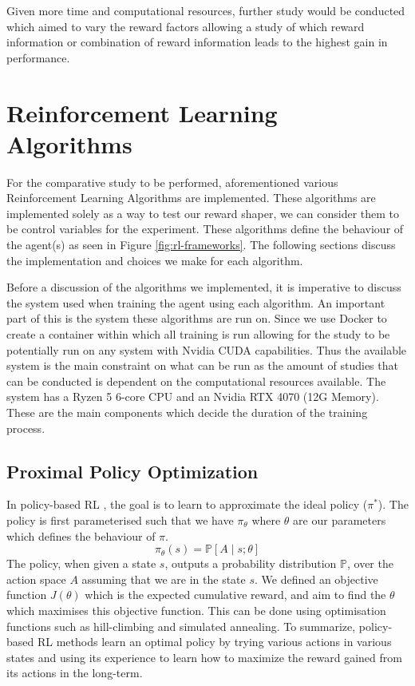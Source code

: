 \documentclass[11pt]{article}
\begin{document}
Given more time and computational resources, further study would be conducted which aimed to vary the reward factors allowing a study of which reward information or combination of reward information leads to the highest gain in performance.

\section{Reinforcement Learning Algorithms}

For the comparative study to be performed, aforementioned various Reinforcement Learning Algorithms are implemented. These algorithms are implemented solely as a way to test our reward shaper, we can consider them to be control variables for the experiment. These algorithms define the behaviour of the agent(s) as  seen in Figure \ref{fig:rl-frameworks}. The following sections discuss the implementation and choices we make for each algorithm.

Before a discussion of the algorithms we implemented, it is imperative to discuss the system used when training the agent using each algorithm.
An important part of this is the system these algorithms are run on. Since we use Docker to create a container within which all training is run allowing for the study to be potentially run on any system with Nvidia CUDA capabilities. Thus the available system is the main constraint on what can be run as the amount of studies that can be conducted is dependent on the computational resources available. The system has a Ryzen 5 6-core CPU and an Nvidia RTX 4070 (12G Memory). These are the main components which decide the duration of the training process.

\subsection{Proximal Policy Optimization}

In policy-based RL \cite{arulkumaran2017deep}, the goal is to learn to approximate the ideal policy ($ \pi^* $).
The policy is first parameterised such that we have $ \pi_\theta$ where $\theta$ are our parameters which defines the behaviour of $\pi$. $$ \pi_\theta(s)=\mathbb{P}[A \mid s ; \theta] $$ The policy, when given a state $s$, outputs a probability distribution $\mathbb{P}$, over the action space $A$ assuming that we are in the state $s$. We defined an objective function $J(\theta)$ which is the expected cumulative reward, and aim to find the $\theta$ which maximises this objective function. This can be done using optimisation functions such as hill-climbing and simulated annealing. To summarize, policy-based RL methods learn an optimal policy by trying various actions in various states and using its experience to learn how to maximize the reward gained from its actions in the long-term.
\end{document}
